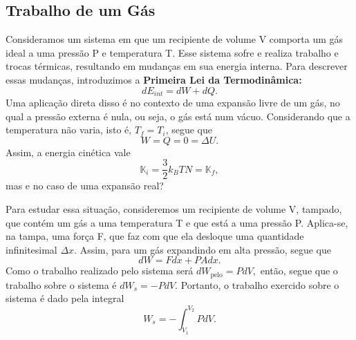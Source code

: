 \documentclass{article}
\begin{document}
\subsection{Trabalho de um Gás}
Consideramos um sistema em que um recipiente de volume V comporta um gás ideal a uma pressão P e 
temperatura T. Esse sistema sofre e realiza trabalho e trocas térmicas, resultando em mudanças em sua energia interna.
Para descrever essas mudanças, introduzimos a \textbf{Primeira Lei da Termodinâmica:} 
\hypertarget{first_thermodynamics}{
  \[
    \boxed{dE_{int} = dW + dQ.}
\]}
Uma aplicação direta disso é no contexto de uma expansão livre de um gás, no qual a pressão externa é nula, ou seja,
o gás está num vácuo. Considerando que a temperatura não varia, isto é, \(T_{f} = T_{i}\), segue que 
\[
  W = Q = 0 = \Delta U.
\]
Assim, a energia cinética vale
\[
  \mathbb{K}_{i} = \frac{3}{2}k_{B}TN = \mathbb{K}_{f},
\]
mas e no caso de uma expansão real?

Para estudar essa situação, consideremos um recipiente de volume V, tampado, que contém um gás a uma temperatura T e que está 
a uma pressão P. Aplica-se, na tampa, uma força F, que faz com que ela desloque uma quantidade infinitesimal \(\Delta x\). Assim,
para um gás expandindo em alta pressão, segue que 
\[
  dW = Fdx + PAdx.
\]
Como o trabalho realizado pelo sistema será \(dW_{\text{pelo}} = PdV,\) então, segue que o trabalho sobre o sistema é
\(dW_{s} = -PdV\). Portanto, o trabalho exercido sobre o sistema é dado pela integral 
\hypertarget{work_gas}{
  \[
    W_{s} = - \int_{V_{1}}^{V_{2}}PdV.
\]}
\end{document}
